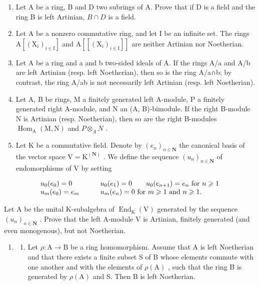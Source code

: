 \begin{enumerate}
\def\labelenumi{\arabic{enumi})}
\setcounter{enumi}{7}
\item
  Let A be a ring, B and D two subrings of A. Prove that if D is a field and the ring B is left Artinian, \(B \cap D\) is a field.
\item
  Let A be a nonzero commutative ring, and let I be an infinite set. The rings \(\mathrm{A}[(\mathrm{X}_{i})_{i\in\mathrm{I}}]\) and \(\mathrm{A}[[(\mathrm{X}_{i})_{i\in\mathrm{I}}]]\) are neither Artinian nor Noetherian.
\item
  Let A be a ring and a and b two-sided ideals of A. If the rings A/a and A/b are left Artinian (resp. left Noetherian), then so is the ring A/a∩b; by contrast, the ring A/ab is not necessarily left Artinian (resp. left Noetherian).
\item
  Let A, B be rings, M a finitely generated left A-module, P a finitely generated right A-module, and N an (A, B)-bimodule. If the right B-module N is Artinian (resp. Noetherian), then so are the right B-modules \(\operatorname{Hom}_{\mathrm{A}}(\mathrm{M}, \mathrm{N})\) and \(P \otimes_{A} N\) .
\item
  Let \(\mathrm{K}\) be a commutative field. Denote by \((e_n)_{n\in \mathbf{N}}\) the canonical basis of the vector space \(\mathrm{V} = \mathrm{K}^{(\mathbf{N})}\) . We define the sequence \((u_n)_{n\in \mathbf{N}}\) of endomorphisms of \(\mathrm{V}\) by setting
\end{enumerate}

\[
\begin{array}{l l} u _ {0} (e _ {0}) = 0 & \qquad u _ {0} (e _ {1}) = 0 \qquad u _ {0} (e _ {n + 1}) = e _ {n} \text { for } n \geqslant 1 \\ u _ {m} (e _ {0}) = e _ {m} & \qquad u _ {m} (e _ {n}) = 0 \text { for } m \geqslant 1 \text { and } n \geqslant 1. \end{array}
\]

Let \(\mathrm{A}\) be the unital K-subalgebra of \(\operatorname{End}_{\mathrm{K}}(\mathrm{V})\) generated by the sequence \((u_n)_{n \in \mathbf{N}}\) . Prove that the left A-module \(\mathrm{V}\) is Artinian, finitely generated (and even monogenous), but not Noetherian.

\begin{enumerate}
\def\labelenumi{\arabic{enumi})}
\setcounter{enumi}{12}
\tightlist
\item
  \begin{enumerate}
  \def\labelenumii{\alph{enumii})}
  \tightlist
  \item
    Let \(\rho: \mathrm{A} \to \mathrm{B}\) be a ring homomorphism. Assume that A is left Noetherian and that there exists a finite subset S of B whose elements commute with one another and with the elements of \(\rho(\mathrm{A})\) , such that the ring B is generated by \(\rho(\mathrm{A})\) and S. Then B is left Noetherian.
  \end{enumerate}
\end{enumerate}


